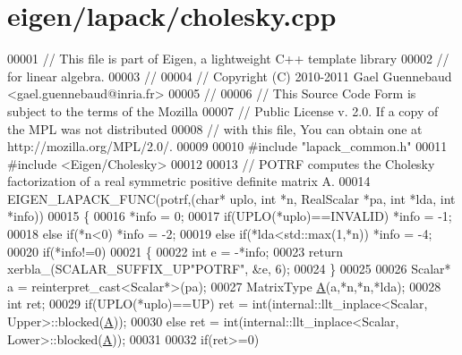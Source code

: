 \hypertarget{eigen_2lapack_2cholesky_8cpp_source}{}\section{eigen/lapack/cholesky.cpp}
\label{eigen_2lapack_2cholesky_8cpp_source}

\begin{DoxyCode}
00001 \textcolor{comment}{// This file is part of Eigen, a lightweight C++ template library}
00002 \textcolor{comment}{// for linear algebra.}
00003 \textcolor{comment}{//}
00004 \textcolor{comment}{// Copyright (C) 2010-2011 Gael Guennebaud <gael.guennebaud@inria.fr>}
00005 \textcolor{comment}{//}
00006 \textcolor{comment}{// This Source Code Form is subject to the terms of the Mozilla}
00007 \textcolor{comment}{// Public License v. 2.0. If a copy of the MPL was not distributed}
00008 \textcolor{comment}{// with this file, You can obtain one at http://mozilla.org/MPL/2.0/.}
00009 
00010 \textcolor{preprocessor}{#include "lapack\_common.h"}
00011 \textcolor{preprocessor}{#include <Eigen/Cholesky>}
00012 
00013 \textcolor{comment}{// POTRF computes the Cholesky factorization of a real symmetric positive definite matrix A.}
00014 EIGEN\_LAPACK\_FUNC(potrf,(\textcolor{keywordtype}{char}* uplo, \textcolor{keywordtype}{int} *n, RealScalar *pa, \textcolor{keywordtype}{int} *lda, \textcolor{keywordtype}{int} *info))
00015 \{
00016   *info = 0;
00017         \textcolor{keywordflow}{if}(UPLO(*uplo)==INVALID) *info = -1;
00018   \textcolor{keywordflow}{else}  \textcolor{keywordflow}{if}(*n<0)                 *info = -2;
00019   \textcolor{keywordflow}{else}  \textcolor{keywordflow}{if}(*lda<std::max(1,*n))  *info = -4;
00020   \textcolor{keywordflow}{if}(*info!=0)
00021   \{
00022     \textcolor{keywordtype}{int} e = -*info;
00023     \textcolor{keywordflow}{return} xerbla\_(SCALAR\_SUFFIX\_UP\textcolor{stringliteral}{"POTRF"}, &e, 6);
00024   \}
00025 
00026   Scalar* a = \textcolor{keyword}{reinterpret\_cast<}Scalar*\textcolor{keyword}{>}(pa);
00027   MatrixType \hyperlink{group___core___module_class_eigen_1_1_matrix}{A}(a,*n,*n,*lda);
00028   \textcolor{keywordtype}{int} ret;
00029   \textcolor{keywordflow}{if}(UPLO(*uplo)==UP) ret = int(internal::llt\_inplace<Scalar, Upper>::blocked(\hyperlink{group___core___module_class_eigen_1_1_matrix}{A}));
00030   \textcolor{keywordflow}{else}                ret = int(internal::llt\_inplace<Scalar, Lower>::blocked(\hyperlink{group___core___module_class_eigen_1_1_matrix}{A}));
00031 
00032   \textcolor{keywordflow}{if}(ret>=0)

\end{DoxyCode}
